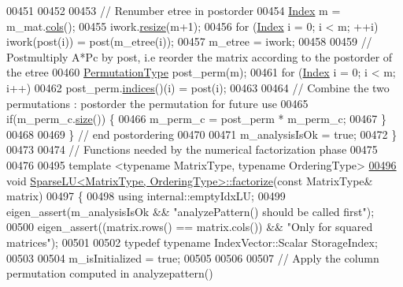 \begin{DoxyCode}
00451       
00452    
00453     \textcolor{comment}{// Renumber etree in postorder }
00454     \hyperlink{namespace_eigen_a62e77e0933482dafde8fe197d9a2cfde}{Index} m = m\_mat.\hyperlink{group___sparse_core___module_aa391750e3c530227e4a5c3c52e959975}{cols}(); 
00455     iwork.\hyperlink{class_eigen_1_1_plain_object_base_a99d9054ee2d5a40c6e00ded0265e9cea}{resize}(m+1);
00456     \textcolor{keywordflow}{for} (\hyperlink{namespace_eigen_a62e77e0933482dafde8fe197d9a2cfde}{Index} i = 0; i < m; ++i) iwork(post(i)) = post(m\_etree(i));
00457     m\_etree = iwork;
00458     
00459     \textcolor{comment}{// Postmultiply A*Pc by post, i.e reorder the matrix according to the postorder of the etree}
00460     \hyperlink{group___core___module}{PermutationType} post\_perm(m); 
00461     \textcolor{keywordflow}{for} (\hyperlink{namespace_eigen_a62e77e0933482dafde8fe197d9a2cfde}{Index} i = 0; i < m; i++) 
00462       post\_perm.\hyperlink{group___core___module_a2f1ab379207fcd1ceb33941e25cf50c2}{indices}()(i) = post(i); 
00463         
00464     \textcolor{comment}{// Combine the two permutations : postorder the permutation for future use}
00465     \textcolor{keywordflow}{if}(m\_perm\_c.\hyperlink{group___core___module_a2216f9ce7b453ac39c46ff0323daeac9}{size}()) \{
00466       m\_perm\_c = post\_perm * m\_perm\_c;
00467     \}
00468     
00469   \} \textcolor{comment}{// end postordering }
00470   
00471   m\_analysisIsOk = \textcolor{keyword}{true}; 
00472 \}
00473 
00474 \textcolor{comment}{// Functions needed by the numerical factorization phase}
00475 
00476 
00495 \textcolor{keyword}{template} <\textcolor{keyword}{typename} MatrixType, \textcolor{keyword}{typename} OrderingType>
\hyperlink{group___sparse_l_u___module_a39858b0e72f2659d596364e252b34cbc}{00496} \textcolor{keywordtype}{void} \hyperlink{group___sparse_l_u___module_a39858b0e72f2659d596364e252b34cbc}{SparseLU<MatrixType, OrderingType>::factorize}(\textcolor{keyword}{const} 
      MatrixType& matrix)
00497 \{
00498   \textcolor{keyword}{using} internal::emptyIdxLU;
00499   eigen\_assert(m\_analysisIsOk && \textcolor{stringliteral}{"analyzePattern() should be called first"}); 
00500   eigen\_assert((matrix.rows() == matrix.cols()) && \textcolor{stringliteral}{"Only for squared matrices"});
00501   
00502   \textcolor{keyword}{typedef} \textcolor{keyword}{typename} IndexVector::Scalar StorageIndex; 
00503   
00504   m\_isInitialized = \textcolor{keyword}{true};
00505   
00506   
00507   \textcolor{comment}{// Apply the column permutation computed in analyzepattern()}

\end{DoxyCode}
